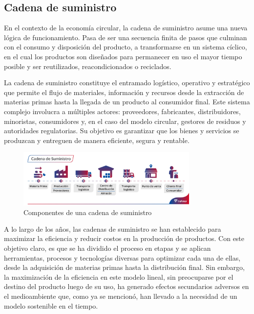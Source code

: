 \subsection{Cadena de suministro}

En el contexto de la economía circular, la cadena de suministro asume una nueva lógica de funcionamiento. Pasa de ser una secuencia finita de pasos que culminan con el consumo y disposición del producto, a transformarse en un sistema cíclico, en el cual los productos son diseñados para permanecer en uso el mayor tiempo posible y ser reutilizados, reacondicionados o reciclados. 

La cadena de suministro constituye el entramado logístico, operativo y estratégico que permite el flujo de materiales, información y recursos desde la extracción de materias primas hasta la llegada de un producto al consumidor final. Este sistema complejo involucra a múltiples actores: proveedores, fabricantes, distribuidores, minoristas, consumidores y, en el caso del modelo circular, gestores de residuos y autoridades regulatorias. Su objetivo es garantizar que los bienes y servicios se produzcan y entreguen de manera eficiente, segura y rentable. 

\begin{figure}[!htpb]
    \centering
    \includegraphics[width=0.8\textwidth]{Figures/supply-chain.png}
    \caption{Componentes de una cadena de suministro}
    \label{fig:supply-chain}
\end{figure}

A lo largo de los años, las cadenas de suministro se han establecido para maximizar la eficiencia y reducir costos en la producción de productos. Con este objetivo claro, es que se ha dividido el proceso en etapas y se aplican herramientas, procesos y tecnologías diversas para optimizar cada una de ellas, desde la adquisición de materias primas hasta la distribución final. Sin embargo, la maximización de la eficiencia en este modelo lineal, sin preocuparse por el destino del producto luego de su uso, ha generado efectos secundarios adversos en el medioambiente que, como ya se mencionó, han llevado a la necesidad de un modelo sostenible en el tiempo.

